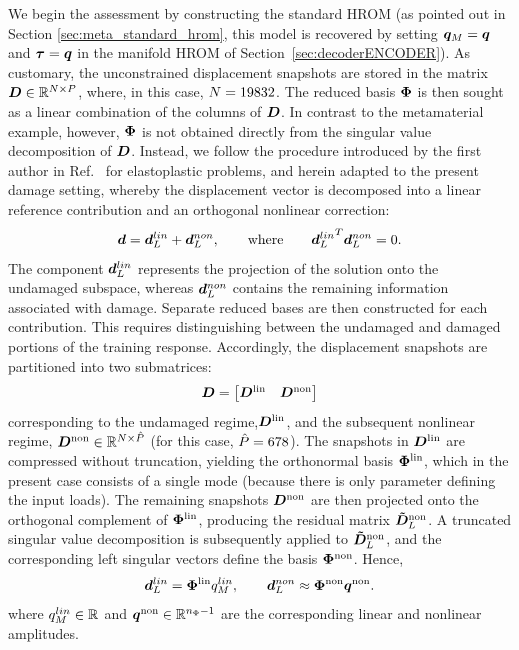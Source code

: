 \documentclass[preprint,10pt]{elsarticle}  %
\begin{document}
We begin the assessment by  constructing the standard   HROM (as pointed out in Section \ref{sec:meta_standard_hrom}, this model is recovered by setting   $\bm{q}_M = \bm{q}$ and $\bm{\tau} = \bm{q}$
in the manifold HROM of  Section~\ref{sec:decoderENCODER}). As customary, the unconstrained displacement snapshots are
stored in the matrix
\(\bm{D}\in\mathbb{R}^{N\times P}\), where, in this case,
\(N=19832\). The reduced basis
\(\bm{\Phi}\) is then sought as a linear combination of the columns of
\(\bm{D}\).  In contrast to the metamaterial example, however, \(\bm{\Phi}\) is not
obtained directly from the singular value decomposition of
\(\bm{D}\). Instead, we follow the procedure introduced by the first author in
Ref.~\cite{hernandez2014high} for elastoplastic problems, and herein
adapted to the present damage setting, whereby the displacement vector
is decomposed into a linear reference contribution and an orthogonal
nonlinear correction:
\begin{equation}
\label{eq:decomNON}
 \bm{d} = \bm{d}_L^{lin} + \bm{d}_L^{non}, \qquad \textrm{where}   \qquad  {\bm{d}_L^{lin}}^T\bm{d}_L^{non} = 0.
\end{equation}
The component \(\bm{d}_L^{lin}\) represents the projection of the solution
onto the undamaged subspace, whereas \(\bm{d}_L^{non}\) contains the
remaining information associated with damage. Separate reduced bases are then constructed for each contribution. This
requires distinguishing between the undamaged and damaged portions of
the training response. Accordingly, the displacement snapshots are partitioned
into two submatrices:
\begin{equation}
\label{eq:dsnapDECOMPOSITION}
 \bm{D} = \begin{bmatrix} \bm{D}^{\mathrm{lin}} & \bm{D}^{\mathrm{non}} \end{bmatrix}
\end{equation}
  corresponding to
the undamaged regime,$\bm{D}^{\mathrm{lin}}$,  and the subsequent
nonlinear regime, $\bm{D}^{\mathrm{non}} \in \mathbb{R}^{N \times \hat{P}}$ (for this case, $\hat{P} =678$).   The snapshots in \(\bm{D}^{\mathrm{lin}}\) are compressed without truncation,
yielding the orthonormal basis \(\boldsymbol{\Phi}^{\mathrm{lin}} \), which in the present case consists
of a single mode (because there is only parameter defining the input loads). The remaining snapshots \(\bm{D}^{\mathrm{non}}\) are then
projected onto the orthogonal complement of \(\boldsymbol{\Phi}^{\mathrm{lin}}\), producing
the residual matrix \({\bm{\tilde{D}}}_L^{\mathrm{non}}\). A truncated singular value
decomposition is subsequently applied to \({\bm{\tilde{D}}}_L^{\mathrm{non}}\), and the
corresponding left singular vectors define the basis
\(\boldsymbol{\Phi}^{\mathrm{non}}\). Hence,
\begin{equation}
\label{eq:bothdecom2s}
\bm{d}_L^{lin}
=
\boldsymbol{\Phi}^{\mathrm{lin}} {q}_M^{lin},
\qquad
\bm{d}_L^{non}
\approx
\boldsymbol{\Phi}^{\mathrm{non}} \bm{q}^{\mathrm{non}}.
\end{equation}
where ${q}_M^{lin} \in \mathbb{R}^{}$ and $\bm{q}^{\mathrm{non}} \in \mathbb{R}^{n_{\Phi} -1}$ are the corresponding linear and nonlinear amplitudes.
\end{document}
